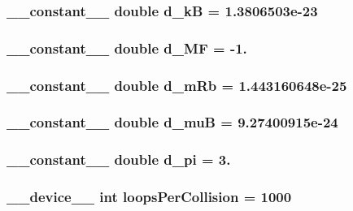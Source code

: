 \hypertarget{move_atoms_8cu_a02c2b3a2e3a9d15ae261492f19abb6e0}{
\subsubsection[{d\+\_\+k\+B}]{\setlength{\rightskip}{0pt plus 5cm}\+\_\+\+\_\+constant\+\_\+\+\_\+ double d\+\_\+k\+B = 1.\+3806503e-\/23}}\label{move_atoms_8cu_a02c2b3a2e3a9d15ae261492f19abb6e0}
\hypertarget{move_atoms_8cu_ad5c6a29d5e5d7f81c07fcdeac2e12ee8}{
\subsubsection[{d\+\_\+\+M\+F}]{\setlength{\rightskip}{0pt plus 5cm}\+\_\+\+\_\+constant\+\_\+\+\_\+ double d\+\_\+\+M\+F = -\/1.}}\label{move_atoms_8cu_ad5c6a29d5e5d7f81c07fcdeac2e12ee8}
\hypertarget{move_atoms_8cu_a19b0469e2c969c9dc1f4d2b9d075ef98}{
\subsubsection[{d\+\_\+m\+Rb}]{\setlength{\rightskip}{0pt plus 5cm}\+\_\+\+\_\+constant\+\_\+\+\_\+ double d\+\_\+m\+Rb = 1.\+443160648e-\/25}}\label{move_atoms_8cu_a19b0469e2c969c9dc1f4d2b9d075ef98}
\hypertarget{move_atoms_8cu_a93a53c442fbe59aedf7224c0f142979c}{
\subsubsection[{d\+\_\+mu\+B}]{\setlength{\rightskip}{0pt plus 5cm}\+\_\+\+\_\+constant\+\_\+\+\_\+ double d\+\_\+mu\+B = 9.\+27400915e-\/24}}\label{move_atoms_8cu_a93a53c442fbe59aedf7224c0f142979c}
\hypertarget{move_atoms_8cu_a246b126f6551267fd21c168b0c1b4fac}{
\subsubsection[{d\+\_\+pi}]{\setlength{\rightskip}{0pt plus 5cm}\+\_\+\+\_\+constant\+\_\+\+\_\+ double d\+\_\+pi = 3.}}\label{move_atoms_8cu_a246b126f6551267fd21c168b0c1b4fac}
\hypertarget{move_atoms_8cu_a46df0a465a8e923e9973ea54f85a0a0d}{
\subsubsection[{loops\+Per\+Collision}]{\setlength{\rightskip}{0pt plus 5cm}\+\_\+\+\_\+device\+\_\+\+\_\+ int loops\+Per\+Collision = 1000}}\label{move_atoms_8cu_a46df0a465a8e923e9973ea54f85a0a0d}

